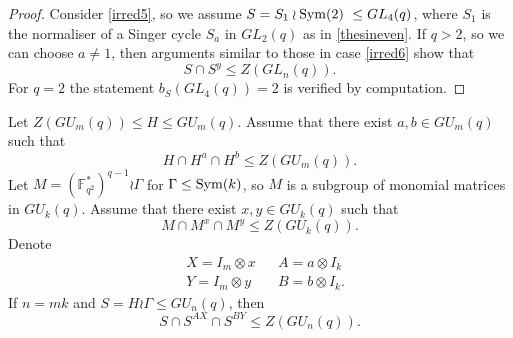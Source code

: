 \begin{proof}
Consider \ref{irred5},  so we  assume $S=S_1 \wr \mathrm{Sym}(2)\ \le GL_4(q)$, where $S_1$ is the normaliser of a Singer cycle $S_a$ in $GL_2(q)$ as in \eqref{thesineven}. If $q>2$, so we can choose $a\ne 1$, then arguments similar to those in case \ref{irred6} show that $$S \cap S^y \le Z(GL_n(q)).$$ For $q=2$ the statement $b_S(GL_4(q))=2$ is verified  by computation.
\end{proof}




\begin{Th} \label{uniind}
Let $Z(GU_m(q)) \le H \le GU_m(q)$. Assume that there exist  $a,b \in GU_m(q)$ such that 
$$H \cap H^a \cap H^b \le Z (GU_m(q)).$$
Let $M=(\mathbb{F}_{q^2}^*)^{q-1} \wr \Gamma$ for $\Gamma \le \mathrm{Sym}(k)$, so $M$ is a subgroup of monomial matrices in $GU_k(q).$ Assume that there exist  $x,y \in GU_k(q)$ such that 
$$M \cap M^x \cap M^y \le Z (GU_k(q)).$$
Denote 
\begin{align*}
&X=I_m \otimes x & & A= a \otimes I_k\\
&Y=I_m \otimes y & & B= b \otimes I_k.
\end{align*} 
If $n=mk$ and $S = H \wr \Gamma \le GU_n(q)$, then 
$$S \cap S^{AX} \cap S^{BY} \le Z(GU_{n}(q)).$$
\end{Th}
